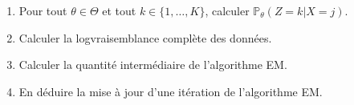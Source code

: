 \documentclass[a4paper,10pt,fleqn]{article}
\newcommand{\1}{\ensuremath{\mathbbm{1}}}
\begin{document}
\begin{enumerate}
\begin{enumerate}
\item Pour tout $\theta\in\Theta$ et tout $k\in\{1,\ldots,K\}$, calculer $\mathbb{P}_\theta(Z=k|X=j)$.

%
\item Calculer la logvraisemblance compl\`ete des donn\'ees.

%
\item  Calculer la quantit\'e interm\'ediaire de l'algorithme EM.

%
\item En d\'eduire la mise \`a jour d'une it\'eration de l'algorithme EM.


\end{enumerate}
\end{enumerate}
\end{document}
